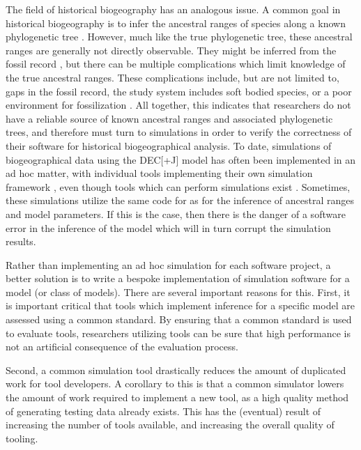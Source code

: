 \documentclass[a4paper]{article}
\begin{document}
The field of historical biogeography has an analogous issue.
A common goal in historical biogeography is to infer the ancestral ranges of species along a known phylogenetic tree
\citep{varela_phylogeny_2019, baker_global_2013, vicente_and_2017}.
However, much like the true phylogenetic tree, these ancestral ranges are generally not directly observable.
They might be inferred from the fossil record \cite{mclachlan_reconstructing_2004}, but there can be multiple
complications which limit knowledge of the true ancestral ranges.
These complications include, but are not limited to, gaps in the fossil record, the study system includes soft bodied
species, or a poor environment for fossilization \cite{kidwell_quality_2002}.
All together, this indicates that researchers do not have a reliable source of known ancestral ranges and associated
phylogenetic trees, and therefore must turn to simulations in order to verify the correctness of their software for
historical biogeographical analysis.
To date, simulations of biogeographical data using the DEC[+J] model has often been implemented in an ad hoc matter,
with individual tools implementing their own simulation framework \cite{matzke_statistical_2022,
bettisworth_lagrange-ng_2023}, even though tools which can perform simulations exist \cite{hohna_revbayes_2016}.
Sometimes, these simulations utilize the same code for as for the inference of ancestral ranges and model parameters.
If this is the case, then there is the danger of a software error in the inference of the model which will in turn
corrupt the simulation results.

Rather than implementing an ad hoc simulation for each software project, a better solution is to write a bespoke
implementation of simulation software for a model (or class of models).
There are several important reasons for this.
First, it is important critical that tools which implement inference for a specific model are assessed using a common
standard.
By ensuring that a common standard is used to evaluate tools, researchers utilizing tools can be sure that high
performance is not an artificial consequence of the evaluation process.

Second, a common simulation tool drastically reduces the amount of duplicated work for tool developers.
A corollary to this is that a common simulator lowers the amount of work required to implement a new tool, as a high
quality method of generating testing data already exists.
This has the (eventual) result of increasing the number of tools available, and increasing the overall quality of
tooling.
\end{document}
